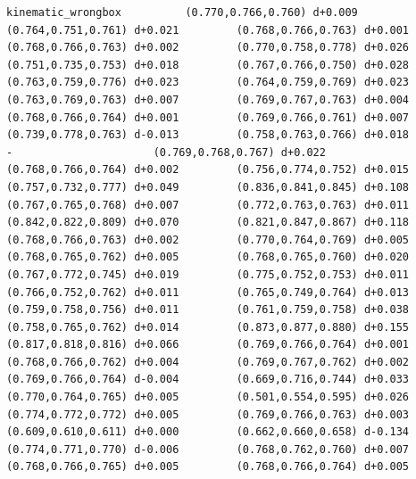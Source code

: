 \documentclass[11pt, letterpaper, openany]{book}
\begin{document}
\begin{empiricalbox}
\begin{lstlisting}[style=terminal]
kinematic_wrongbox          (0.770,0.766,0.760) d+0.009         (0.764,0.751,0.761) d+0.021         (0.768,0.766,0.763) d+0.001         (0.768,0.766,0.763) d+0.002         (0.770,0.758,0.778) d+0.026         (0.751,0.735,0.753) d+0.018         (0.767,0.766,0.750) d+0.028         (0.763,0.759,0.776) d+0.023         (0.764,0.759,0.769) d+0.023         (0.763,0.769,0.763) d+0.007         (0.769,0.767,0.763) d+0.004         (0.768,0.766,0.764) d+0.001         (0.769,0.766,0.761) d+0.007         (0.739,0.778,0.763) d-0.013         (0.758,0.763,0.766) d+0.018                      -                      (0.769,0.768,0.767) d+0.022         (0.768,0.766,0.764) d+0.002         (0.756,0.774,0.752) d+0.015         (0.757,0.732,0.777) d+0.049         (0.836,0.841,0.845) d+0.108         (0.767,0.765,0.768) d+0.007         (0.772,0.763,0.763) d+0.011         (0.842,0.822,0.809) d+0.070         (0.821,0.847,0.867) d+0.118         (0.768,0.766,0.763) d+0.002         (0.770,0.764,0.769) d+0.005         (0.768,0.765,0.762) d+0.005         (0.768,0.765,0.760) d+0.020         (0.767,0.772,0.745) d+0.019         (0.775,0.752,0.753) d+0.011         (0.766,0.752,0.762) d+0.011         (0.765,0.749,0.764) d+0.013         (0.759,0.758,0.756) d+0.011         (0.761,0.759,0.758) d+0.038         (0.758,0.765,0.762) d+0.014         (0.873,0.877,0.880) d+0.155         (0.817,0.818,0.816) d+0.066         (0.769,0.766,0.764) d+0.001         (0.768,0.766,0.762) d+0.004         (0.769,0.767,0.762) d+0.002         (0.769,0.766,0.764) d-0.004         (0.669,0.716,0.744) d+0.033         (0.770,0.764,0.765) d+0.005         (0.501,0.554,0.595) d+0.026         (0.774,0.772,0.772) d+0.005         (0.769,0.766,0.763) d+0.003         (0.609,0.610,0.611) d+0.000         (0.662,0.660,0.658) d-0.134         (0.774,0.771,0.770) d-0.006         (0.768,0.762,0.760) d+0.007         (0.768,0.766,0.765) d+0.005         (0.768,0.766,0.764) d+0.005     

\end{lstlisting}
\end{empiricalbox}
\end{document}
